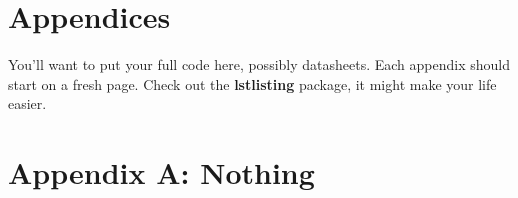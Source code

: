 \documentclass[letterpaper,11pt]{texMemo} %
\begin{document}
\section*{Appendices}
You'll want to put your full code here, possibly datasheets. Each appendix should start on a fresh page. Check out the \textbf{lstlisting} package, it might make your life easier.
\newpage

\section*{Appendix A: Nothing}

\end{document}
